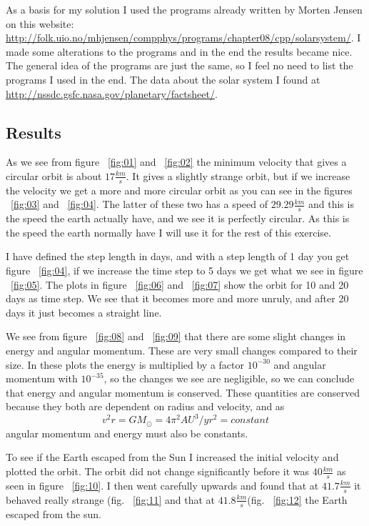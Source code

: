 \documentclass[a4wide,12pt]{article}
\begin{document}
As a basis for my solution I used the programs already written by Morten Jensen on this website: \url{http://folk.uio.no/mhjensen/compphys/programs/chapter08/cpp/solarsystem/}. 
I made some alterations to the programs and in the end the results became nice. The general idea of the programs are just the same, so I feel no need to list the programs I used in the end. 
The data about the solar system I found at \url{http://nssdc.gsfc.nasa.gov/planetary/factsheet/}. 

\subsection*{Results}
As we see from figure ~\ref{fig:01} and ~\ref{fig:02} the minimum velocity that gives a circular orbit is about $17 \frac{km}{s}$. It gives a slightly strange orbit, but if we increase the velocity we get a more and more circular orbit as you can see in the figures ~\ref{fig:03} and ~\ref{fig:04}. The latter of these two has a speed of $29.29 \frac{km}{s}$ and this is the speed the earth actually have, and we see it is perfectly circular. As this is the speed the earth normally have I will use it for the rest of this exercise. 

I have defined the step length in days, and with a step length of 1 day you get figure ~\ref{fig:04}, if we increase the time step to 5 days we get what we see in figure ~\ref{fig:05}. The plots in figure ~\ref{fig:06} and ~\ref{fig:07} show the orbit for 10 and 20 days as time step. We see that it becomes more and more unruly, and after 20 days it just becomes a straight line. 

We see from figure ~\ref{fig:08} and ~\ref{fig:09} that there are some slight changes in energy and angular momentum. 
These are very small changes compared to their size. In these plots the energy is multiplied by a factor $10^{-30}$ and angular momentum with $10^{-35}$, so the changes we see are
negligible, so we can conclude that energy and angular momentum is conserved. These quantities are conserved because they both are dependent on radius and velocity, and as
\[
v^{2}r = GM_{\odot} = 4\pi^{2}AU^{3}/yr^{2} = constant
\] 
angular momentum and energy must also be constants. 

To see if the Earth escaped from the Sun I increased the initial velocity and plotted the orbit. The orbit did not change significantly before it was $40 \frac{km}{s}$ as seen in figure ~\ref{fig:10}.
I then went carefully upwards and found that at $41.7 \frac{km}{s}$ it behaved really strange (fig. ~\ref{fig:11} and that at $41.8 \frac{km}{s}$(fig. ~\ref{fig:12} the Earth escaped from the sun. 
\end{document}
